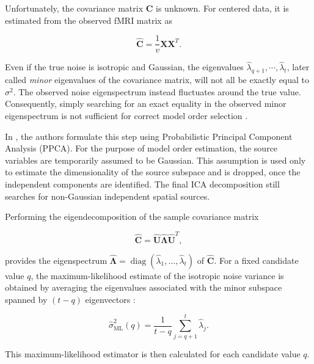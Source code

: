 \documentclass[english]{pwr_wmat_praca_dyplomowa}
\theoremstyle{definition}
\theoremstyle{remark}
\begin{document}
Unfortunately, the covariance matrix $\mathbf{C}$ is unknown. For centered data, it is estimated from the observed fMRI matrix as

\begin{equation}
    \widehat{\mathbf{C}} = \frac{1}{v} \mathbf{X}\mathbf{X}^T.
    \label{eq:pica-covariance-matrix}
\end{equation}

Even if the true noise is isotropic and Gaussian, the eigenvalues $\widehat{\lambda}_{q+1}, \cdots, \widehat{\lambda}_t$, later called \textit{minor} eigenvalues of the covariance matrix, will not all be exactly equal to $\sigma^2$. The observed noise eigenspectrum instead fluctuates around the true value. Consequently, simply searching for an exact equality in the observed minor eigenspectrum is not sufficient for correct model order selection \cite{pica}.

In \cite{pica}, the authors formulate this step using Probabilistic Principal Component Analysis (PPCA). For the purpose of model order estimation, the source variables are temporarily assumed to be Gaussian. This assumption is used only to estimate the dimensionality of the source subspace and is dropped, once the independent components are identified. The final ICA decomposition still searches for non-Gaussian independent spatial sources.

\newpage
Performing the eigendecomposition of the sample covariance matrix

\begin{equation}
    \widehat{\mathbf{C}} = \widehat{\mathbf{U}} \widehat{\boldsymbol{\Lambda}} \widehat{\mathbf{U}}^T,
    \label{eq:eig-covariance}
\end{equation}

provides the eigenspectrum $\widehat{\boldsymbol{\Lambda}} = \operatorname{diag}\left(\widehat{\lambda}_1, \ldots, \widehat{\lambda}_t\right)$ of $\widehat{\mathbf{C}}$. For a fixed candidate value $q$, the maximum-likelihood estimate of the isotropic noise variance is obtained by averaging the eigenvalues associated with the minor subspace spanned by $(t - q)$ eigenvectors \cite{pica}:

\begin{equation}
    \widehat{\sigma}_{\mathrm{ML}}^2(q) = \frac{1}{t-q} \sum_{j=q+1}^{t} \widehat{\lambda}_j.
\end{equation}

This maximum-likelihood estimator is then calculated for each candidate value $q$.
\end{document}

